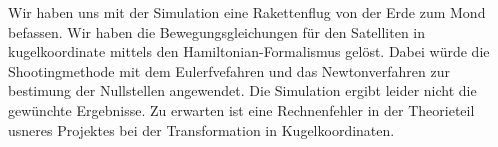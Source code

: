 \documentclass{subfiles}
\begin{document}
    Wir haben uns mit der Simulation eine Rakettenflug von der Erde zum Mond befassen. Wir haben die Bewegungsgleichungen für den Satelliten in kugelkoordinate 
    mittels den Hamiltonian-Formalismus gelöst. Dabei würde die Shootingmethode mit dem Eulerfvefahren und das Newtonverfahren zur bestimung der Nullstellen angewendet.
    Die Simulation ergibt leider nicht die gewünchte Ergebnisse. Zu erwarten ist eine Rechnenfehler in der Theorieteil usneres Projektes bei der Transformation in Kugelkoordinaten.
\end{document}
